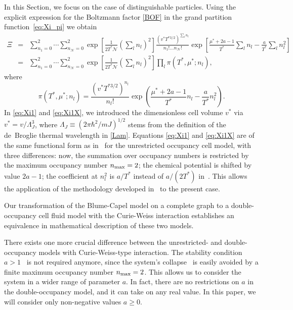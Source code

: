 \documentclass[pdflatex,sn-mathphys-num]{sn-jnl}%
\theoremstyle{thmstyleone}%
\theoremstyle{thmstyletwo}%
\theoremstyle{thmstylethree}%
\begin{document}
	In this Section, we focus on the case of distinguishable particles.
	Using the explicit expression for the Boltzmann factor \eqref{BOF} in the grand partition function~\eqref{eq:Xi_pi} we obtain
	\begin{eqnarray}
		\label{eq:Xi1}
		\Xi & = & \sum_{n_1 = 0}^2 \cdots \sum_{n_{\mathscr{N}} = 0}^2 \exp\left[\frac{1}{2T^*\mathscr{N}} \left(\sum_l n_l\right)^2\right] \frac{\left(v^* T^{*3/2}\right)^{\sum_l n_l}}{n_1! \ldots n_{\mathscr{N}}!} \exp\left[\frac{\mu^* + 2a - 1}{T^*}\sum_l n_l - \frac{a}{T^*}\sum_l n_l^2\right]
		\nonumber\\
		& = & \sum_{n_1 = 0}^2 \cdots \sum_{n_{\mathscr{N}} = 0}^2 \exp\left[\frac{1}{2T^*\mathscr{N}} \left(\sum_l n_l\right)^2\right] \prod_l \pi(T^*,\mu^*;n_l),
	\end{eqnarray}
	where
	\begin{equation}\label{eq:Xi1X}
		\pi(T^*,\mu^*; n_l) = \frac{\left(v^* T^{*3/2}\right)^{n_l}}{n_l!} \exp\left(\frac{\mu^* + 2a -1}{T^*}n_l - \frac{a}{T^*} n_l^2\right).
	\end{equation}
	In \eqref{eq:Xi1} and \eqref{eq:Xi1X}, we introduced the dimensionless cell volume $v^*$ via $v^* = v/\Lambda_J^3$, where $\Lambda_J\equiv(2\pi \hbar^2/mJ)^{1/2}$ stems from the definition of the de~Broglie thermal wavelength in \eqref{Lam}.
	Equations \eqref{eq:Xi1} and \eqref{eq:Xi1X} are of the same functional form as in~\cite[(2.11)]{KKD20} for the unrestricted occupancy cell model, with three differences: now, the summation over occupancy numbers is restricted by the maximum occupancy number $n_{\rm max}=2$; the chemical potential is shifted by value $2a-1$; the coefficient at $n_l^2$ is $a/T^*$ instead of $a/(2T^*)$ in~\cite[(2.11)]{KKD20}. This allows the application of the methodology developed in~\cite{KKD20,KD22,RDKPS26a} to the present case.
	
	Our transformation of the Blume-Capel model on a complete graph to a double-occupancy cell fluid model with the Curie-Weiss interaction establishes an equivalence in mathematical description of these two models.
	
	There exists one more crucial difference between the unrestricted- and double-occupancy models with Curie-Weiss-type interaction. The stability condition $a > 1$~\cite{KKD20} is not required anymore, since the system's collapse~\cite{FR66,HR07,FL20} is easily avoided by a finite maximum occupancy number $n_{\rm max}=2$. This allows us to consider the system in a wider range of parameter $a$. In fact, there are no restrictions on $a$ in the double-occupancy model, and it can take on any real value. In this paper, we will consider only non-negative values $a \geq 0$.
	
\end{document}
